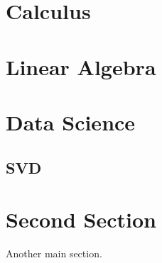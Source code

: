 \documentclass{article}
\begin{document}

\section{Calculus}

\section{Linear Algebra}

\section{Data Science}
\subsection{SVD}



\section{Second Section}
Another main section.
\end{document}
